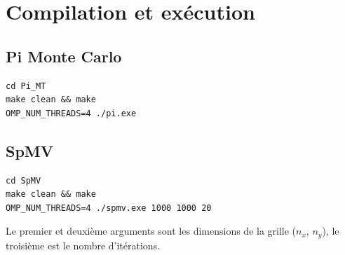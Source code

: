 \documentclass[12pt,a4paper]{article}
\begin{document}
\newpage
\section{Compilation et exécution}

\subsection{Pi Monte Carlo}

\begin{lstlisting}[style=bashstyle]
cd Pi_MT
make clean && make
OMP_NUM_THREADS=4 ./pi.exe
\end{lstlisting}

\subsection{SpMV}

\begin{lstlisting}[style=bashstyle]
cd SpMV
make clean && make
OMP_NUM_THREADS=4 ./spmv.exe 1000 1000 20
\end{lstlisting}

Le premier et deuxième arguments sont les dimensions de la grille ($n_x$, $n_y$), le troisième est le nombre d'itérations.
\end{document}

